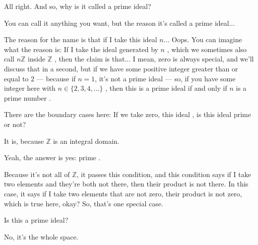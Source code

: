 \begin{speech}[00:49:27 - 00:50:54]
All right. And so, why is it called a prime ideal?

You can call it anything you want, but the reason it's called a prime ideal... 

The reason for the name is that if I take this ideal $n$...  Oops. You can imagine what the reason is: If I take the ideal generated by $n$ , which we sometimes also call $n\mathbb{Z}$ inside $\mathbb{Z}$ , then the claim is that... I mean, zero is always special, and we'll discuss that in a second, but if we have some positive integer greater than or equal to $2$  --- because if $n = 1$, it's not a prime ideal --- so, if you have some integer here with $n \in \{2, 3, 4, \dots\}$ , then this is a prime ideal if and only if $n$ is a prime number .

There are the boundary cases here: If we take zero, this ideal , is this ideal prime or not?
\end{speech}

\begin{student}
It is, because $\mathbb{Z}$ is an integral domain.
\end{student}

\begin{speech}[00:51:03 - 00:51:36]
Yeah, the answer is yes: prime .

Because it's not all of $\mathbb{Z}$, it passes this condition, and this condition says if I take two elements and they're both not there, then their product is not there. In this case, it says if I take two elements that are not zero, their product is not zero, which is true here, okay? So, that's one special case.

Is this a prime ideal? 
\end{speech}

\begin{student}
No, it's the whole space.
\end{student}

